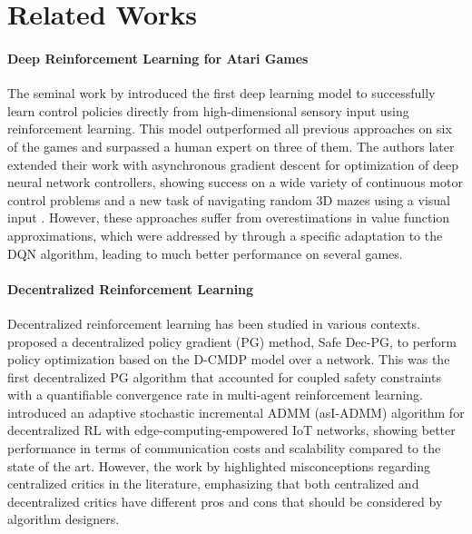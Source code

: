 \section{Related Works}

\paragraph{Deep Reinforcement Learning for Atari Games}
The seminal work by \citet{mnih2013playing} introduced the first deep learning model to successfully learn control policies directly from high-dimensional sensory input using reinforcement learning. This model outperformed all previous approaches on six of the games and surpassed a human expert on three of them. The authors later extended their work with asynchronous gradient descent for optimization of deep neural network controllers, showing success on a wide variety of continuous motor control problems and a new task of navigating random 3D mazes using a visual input \citep{mnih2016asynchronous}. However, these approaches suffer from overestimations in value function approximations, which were addressed by \citet{hasselt2015deep} through a specific adaptation to the DQN algorithm, leading to much better performance on several games.

\paragraph{Decentralized Reinforcement Learning}
Decentralized reinforcement learning has been studied in various contexts. \citet{lu2021decentralized} proposed a decentralized policy gradient (PG) method, Safe Dec-PG, to perform policy optimization based on the D-CMDP model over a network. This was the first decentralized PG algorithm that accounted for coupled safety constraints with a quantifiable convergence rate in multi-agent reinforcement learning. \citet{lei2022adaptive} introduced an adaptive stochastic incremental ADMM (asI-ADMM) algorithm for decentralized RL with edge-computing-empowered IoT networks, showing better performance in terms of communication costs and scalability compared to the state of the art. However, the work by \citet{lyu2021contrasting} highlighted misconceptions regarding centralized critics in the literature, emphasizing that both centralized and decentralized critics have different pros and cons that should be considered by algorithm designers.

